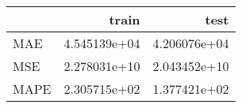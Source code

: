 \begin{tabular}{lrr}
\toprule
{} &         train &          test \\
\midrule
MAE  &  4.545139e+04 &  4.206076e+04 \\
MSE  &  2.278031e+10 &  2.043452e+10 \\
MAPE &  2.305715e+02 &  1.377421e+02 \\
\bottomrule
\end{tabular}
